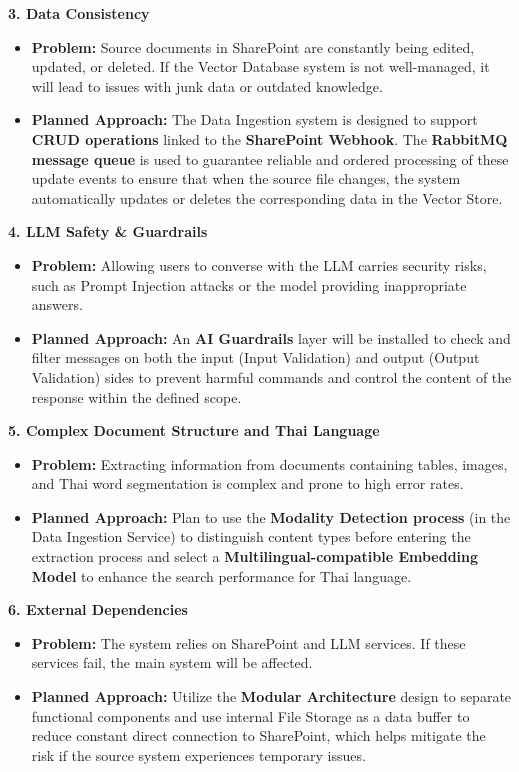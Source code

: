 \documentclass[12pt]{article}
\begin{document}
\textbf{3. Data Consistency}
\begin{itemize}
    \item \textbf{Problem:} Source documents in SharePoint are constantly being edited, updated, or deleted. If the Vector Database system is not well-managed, it will lead to issues with junk data or outdated knowledge.
    \item \textbf{Planned Approach:} The Data Ingestion system is designed to support \textbf{CRUD operations} linked to the \textbf{SharePoint Webhook}. The \textbf{RabbitMQ message queue} is used to guarantee reliable and ordered processing of these update events to ensure that when the source file changes, the system automatically updates or deletes the corresponding data in the Vector Store.
\end{itemize}

\textbf{4. LLM Safety \& Guardrails}
\begin{itemize}
    \item \textbf{Problem:} Allowing users to converse with the LLM carries security risks, such as Prompt Injection attacks or the model providing inappropriate answers.
    \item \textbf{Planned Approach:} An \textbf{AI Guardrails} layer will be installed to check and filter messages on both the input (Input Validation) and output (Output Validation) sides to prevent harmful commands and control the content of the response within the defined scope.
\end{itemize}

\textbf{5. Complex Document Structure and Thai Language}
\begin{itemize}
    \item \textbf{Problem:} Extracting information from documents containing tables, images, and Thai word segmentation is complex and prone to high error rates.
    \item \textbf{Planned Approach:} Plan to use the \textbf{Modality Detection process} (in the Data Ingestion Service) to distinguish content types before entering the extraction process and select a \textbf{Multilingual-compatible Embedding Model} to enhance the search performance for Thai language.
\end{itemize}

\textbf{6. External Dependencies}
\begin{itemize}
    \item \textbf{Problem:} The system relies on SharePoint and LLM services. If these services fail, the main system will be affected.
    \item \textbf{Planned Approach:} Utilize the \textbf{Modular Architecture} design to separate functional components and use internal File Storage as a data buffer to reduce constant direct connection to SharePoint, which helps mitigate the risk if the source system experiences temporary issues.
\end{itemize}
\end{document}
